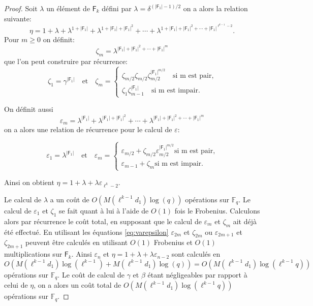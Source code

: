 \documentclass[10pt,a4paper]{book}
\theoremstyle{plain}
\theoremstyle{definition}
\theoremstyle{definition}
\theoremstyle{definition}
\theoremstyle{definition}
\theoremstyle{definition}
\theoremstyle{remark}
\theoremstyle{remark}
\theoremstyle{definition}
\begin{document}
\begin{proof}
Soit $\lambda$ un élément de $\mathsf{F}_k$ défini par $\lambda = \delta^{(|\mathsf{F}_1|-1)/2} $ on a alors la relation suivante:
\begin{equation*}
\eta = 1 + \lambda + \lambda^{1+|\mathsf{F}_1|} + \lambda^{1+|\mathsf{F}_1|+|\mathsf{F}_1|^{2}} + \cdots + \lambda^{1+|\mathsf{F}_1|+|\mathsf{F}_1|^{2}+\cdots+|\mathsf{F}_1|^{\ell^{k-1}-2}}. 
\end{equation*}
Pour $m \geqslant 0$ on définit:
\begin{equation}
\zeta_m=\lambda^{|\mathsf{F}_1|+|\mathsf{F}_1|^2+\cdots+|\mathsf{F}_1|^{m}} 
\end{equation}
que l'on peut construire par récurrence:
\begin{equation*}
\zeta_1=\gamma^{|\mathsf{F}_1|} \quad \text{et} \quad
\zeta_m=
\begin{cases} 
\zeta_{m/2}  \zeta_{m/2}\zeta_{m/2}^{|\mathsf{F}_1|^{m/2}} \quad \text{si m est pair,}\\
\zeta_{1}  \zeta_{m-1}^{|\mathsf{F}_1|} \quad \text{si m est impair.}
\end{cases}
\end{equation*}

On définit aussi
\begin{equation*}
\varepsilon_m=\lambda^{|\mathsf{F}_1|} + \lambda^{|\mathsf{F}_1|+|\mathsf{F}_1|^{2}} + \cdots + \lambda^{|\mathsf{F}_1|+|\mathsf{F}_1|^{2}+\cdots+|\mathsf{F}_1|^{m}}
\end{equation*} 
on a alors une relation de récurrence pour le calcul de $\varepsilon$:

\begin{equation}
\label{eq:varepsilon}
\varepsilon_1=\lambda^{|\mathsf{F}_1|} \quad \text{et} \quad
\varepsilon_m=
\begin{cases} 
\varepsilon_{m/2} + \zeta_{m/2}\varepsilon_{m/2}^{|\mathsf{F}_1|^{m/2}} \text{si m est pair,}\\
\varepsilon_{m-1} + \zeta_{m} \text{si m est impair.}
\end{cases}
\end{equation}

Ainsi on obtient $\eta=1+\lambda+\lambda \varepsilon_{\ell^k-2}$. 

 
Le calcul de $\lambda$ a un coût de $O(M(\ell^{k-1}d_1)\log(q))$ opérations sur $\mathbb{F}_q$. Le calcul de $\varepsilon_1$ et $\zeta_1$ se fait quant à lui à l'aide de $O(1)$ fois le Frobenius. Calculons alors par récurrence le coût total, en supposant que le calcul de $\varepsilon_m$ et $\zeta_m$ ait déjà été effectué. En utilisant les équations \eqref{eq:varepsilon} $\varepsilon_{2m}$ et $\zeta_{2m}$ ou $\varepsilon_{2m+1}$ et $\zeta_{2m+1}$ peuvent être calculés en utilisant $O(1)$ Frobenius et $O(1)$ multiplications sur $\mathsf{F}_{k}$. Ainsi $\varepsilon_n$ et $\eta=1+\lambda+\lambda\varepsilon_{n-2}$ sont calculés en $O(M(\ell^{k-1}d_1)\log(\ell^{k-1})+M(\ell^{k-1}d_1)\log(q))=O(M(\ell^{k-1}d_1)\log(\ell^{k-1}q))$ opérations sur $\mathbb{F}_q$.
Le coût de calcul de $\gamma$ et $\beta$ étant négligeables par rapport à celui de $\eta$, on a alors un coût total de $O(M(\ell^{k-1}d_1)\log(\ell^{k-1}q))$ opérations sur $\mathbb{F}_q$.

\end{proof}
\end{document}

